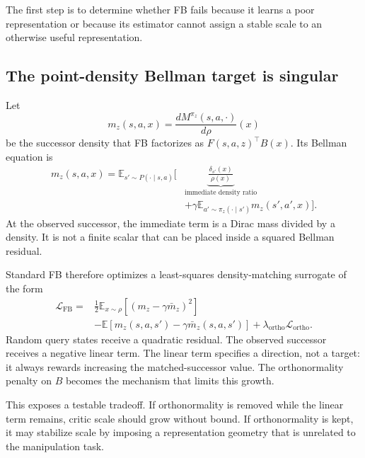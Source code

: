 \documentclass{article}
\newcommand{\E}{\mathbb{E}}
\begin{document}
The first step is to determine whether FB fails because it learns a poor
representation or because its estimator cannot assign a stable scale to an
otherwise useful representation.

\subsection{The point-density Bellman target is singular}
\label{sec:singular}

Let
\begin{equation}
m_z(s,a,x)=\frac{dM^{\pi_z}(s,a,\cdot)}{d\rho}(x)
\end{equation}
be the successor density that FB factorizes as
$F(s,a,z)^{\top}B(x)$. Its Bellman equation is
\begin{equation}
\label{eq:density-bellman}
\begin{split}
m_z(s,a,x)
=
\E_{s'\sim P(\cdot\mid s,a)}\Bigg[
&\underbrace{\frac{\delta_{s'}(x)}{\rho(x)}}_{\text{immediate density ratio}}
\\
&+\gamma\E_{a'\sim\pi_z(\cdot\mid s')}m_z(s',a',x)
\Bigg].
\end{split}
\end{equation}
At the observed successor, the immediate term is a Dirac mass divided by a
density. It is not a finite scalar that can be placed inside a squared Bellman
residual.

Standard FB therefore optimizes a least-squares density-matching surrogate of the
form
\begin{equation}
\label{eq:fb-loss}
\begin{split}
\mathcal{L}_{\mathrm{FB}}
=
&\frac{1}{2}\E_{x\sim\rho}
\left[(m_z-\gamma\bar m_z)^2\right]
\\
&-\E\left[m_z(s,a,s')-\gamma\bar m_z(s,a,s')\right]
+\lambda_{\mathrm{ortho}}\mathcal{L}_{\mathrm{ortho}}.
\end{split}
\end{equation}
Random query states receive a quadratic residual. The observed successor receives
a negative linear term. The linear term specifies a direction, not a target: it
always rewards increasing the matched-successor value. The orthonormality penalty
on $B$ becomes the mechanism that limits this growth.

This exposes a testable tradeoff. If orthonormality is removed while the linear
term remains, critic scale should grow without bound. If orthonormality is kept,
it may stabilize scale by imposing a representation geometry that is unrelated to
the manipulation task.
\end{document}
